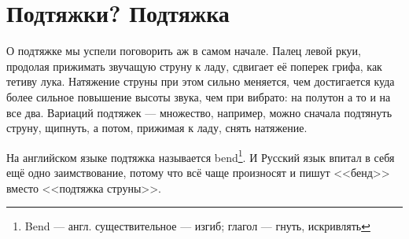 \section{Подтяжки? Подтяжка}

О подтяжке мы успели поговорить аж в самом начале. Палец левой ркуи, продолая прижимать звучащую струну к ладу, сдвигает её поперек грифа, как тетиву лука. Натяжение струны при этом сильно меняется, чем достигается куда более сильное повышение высоты звука, чем при вибрато: на полутон а то и на все два. Вариаций подтяжек --- множество, например, можно сначала подтянуть струну, щипнуть, а потом, прижимая к ладу, снять натяжение. 

На английском языке подтяжка называется bend\footnote{Bend --- англ. существительное --- изгиб; глагол --- гнуть, искривлять}. И Русский язык впитал в себя ещё одно заимствование, потому что всё чаще произносят и пишут <<бенд>> вместо <<подтяжка струны>>.
